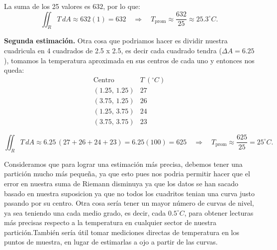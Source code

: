 \begin{respuesta}
La suma de los 25 valores es $632$, por lo que:
\[
\iint_R T\,dA\approx 632(1)=632
\quad\Rightarrow\quad
T_{\mathrm{prom}}\approx\frac{632}{25}\approx{25.3^\circ C}.
\]

\textbf{Segunda estimación.} Otra cosa que podriamos hacer es dividir nuestra cuadricula  en 4 cuadrados de 2.5 x 2.5, es decir cada cuadrado tendra ($\Delta A= 6.25$), tomamos la temperatura aproximada en sus centros de cada uno y entonces nos queda: 
\[
\begin{array}{c|c}
\text{Centro} & T\ (^\circ C)\\\hline
(1.25,\,1.25) & 27\\
(3.75,\,1.25) & 26\\
(1.25,\,3.75) & 24\\
(3.75,\,3.75) & 23
\end{array}
\]

\[
\iint_R T\,dA\approx 6.25\,(27+26+24+23)=6.25(100)=625
\quad\Rightarrow\quad
T_{\mathrm{prom}}\approx\frac{625}{25}={25^\circ C}.
\]

Consideramos que para lograr una estimación más precisa, debemos tener una partición mucho más pequeña, ya que esto pues nos podria permitir hacer que el error en nuestra suma de Riemann disminuya ya que los datos se han sacado basado en nuestra suposicion ya que no todos los cuadritos tenian una curva justo pasando por su centro. Otra cosa sería tener un mayor número de curvas de nivel, ya sea teniendo una cada medio grado, es decir, cada \(0.5^\circ C\), para obtener lecturas más precisas respecto a la temperatura en cualquier sector de nuestra partición.También sería útil tomar mediciones directas de temperatura en los puntos de muestra, en lugar de estimarlas a ojo a partir de las curvas. 

\end{respuesta}
